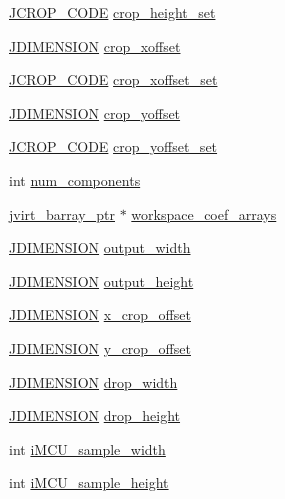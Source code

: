 \begin{DoxyCompactItemize}
\hyperlink{transupp_8h_a8286e58d1d84a5e78d711cd37e9b68a2}{J\+C\+R\+O\+P\+\_\+\+C\+O\+D\+E} \hyperlink{structjpeg__transform__info_a4033ed36c4d01a9481dbc5cef334ef1c}{crop\+\_\+height\+\_\+set}
\item 
\hyperlink{jmorecfg_8h_a04ed4674f6f1d0d50ec241531e38274f}{J\+D\+I\+M\+E\+N\+S\+I\+O\+N} \hyperlink{structjpeg__transform__info_a88127ce4987f06cc0cbf84398f277095}{crop\+\_\+xoffset}
\item 
\hyperlink{transupp_8h_a8286e58d1d84a5e78d711cd37e9b68a2}{J\+C\+R\+O\+P\+\_\+\+C\+O\+D\+E} \hyperlink{structjpeg__transform__info_a8c8de4faefef7497d94eaa29c67c93fc}{crop\+\_\+xoffset\+\_\+set}
\item 
\hyperlink{jmorecfg_8h_a04ed4674f6f1d0d50ec241531e38274f}{J\+D\+I\+M\+E\+N\+S\+I\+O\+N} \hyperlink{structjpeg__transform__info_a71c704caef9a80035e4076c41b4cb3f4}{crop\+\_\+yoffset}
\item 
\hyperlink{transupp_8h_a8286e58d1d84a5e78d711cd37e9b68a2}{J\+C\+R\+O\+P\+\_\+\+C\+O\+D\+E} \hyperlink{structjpeg__transform__info_a246724b0945d6cfd8b52cec7cd7f0d82}{crop\+\_\+yoffset\+\_\+set}
\item 
int \hyperlink{structjpeg__transform__info_a87e3cb664c289649af4ef16b528d995e}{num\+\_\+components}
\item 
\hyperlink{jpeglib_8h_a994f4cba141d82ded90af38e51223f0b}{jvirt\+\_\+barray\+\_\+ptr} $\ast$ \hyperlink{structjpeg__transform__info_a76eb9df454f32d48eafb01b3f433da5c}{workspace\+\_\+coef\+\_\+arrays}
\item 
\hyperlink{jmorecfg_8h_a04ed4674f6f1d0d50ec241531e38274f}{J\+D\+I\+M\+E\+N\+S\+I\+O\+N} \hyperlink{structjpeg__transform__info_ad7b80a24544a8287eae5d4c51b763f39}{output\+\_\+width}
\item 
\hyperlink{jmorecfg_8h_a04ed4674f6f1d0d50ec241531e38274f}{J\+D\+I\+M\+E\+N\+S\+I\+O\+N} \hyperlink{structjpeg__transform__info_a2fad8399e6b85f850152929e279eace5}{output\+\_\+height}
\item 
\hyperlink{jmorecfg_8h_a04ed4674f6f1d0d50ec241531e38274f}{J\+D\+I\+M\+E\+N\+S\+I\+O\+N} \hyperlink{structjpeg__transform__info_ad96a77528f72b2251b94d04ae396b435}{x\+\_\+crop\+\_\+offset}
\item 
\hyperlink{jmorecfg_8h_a04ed4674f6f1d0d50ec241531e38274f}{J\+D\+I\+M\+E\+N\+S\+I\+O\+N} \hyperlink{structjpeg__transform__info_adeadce805b25751fd43263e2fcd2e166}{y\+\_\+crop\+\_\+offset}
\item 
\hyperlink{jmorecfg_8h_a04ed4674f6f1d0d50ec241531e38274f}{J\+D\+I\+M\+E\+N\+S\+I\+O\+N} \hyperlink{structjpeg__transform__info_a6c63db1d6f705cc9e4bccd2efee11bde}{drop\+\_\+width}
\item 
\hyperlink{jmorecfg_8h_a04ed4674f6f1d0d50ec241531e38274f}{J\+D\+I\+M\+E\+N\+S\+I\+O\+N} \hyperlink{structjpeg__transform__info_a4e51b93c0ac407e998e8d643465c48bb}{drop\+\_\+height}
\item 
int \hyperlink{structjpeg__transform__info_a6c67f5ce5320a5d532acd6a6df14f1f4}{i\+M\+C\+U\+\_\+sample\+\_\+width}
\item 
int \hyperlink{structjpeg__transform__info_a6b6606b8e8315e161fda4ddb29b2d410}{i\+M\+C\+U\+\_\+sample\+\_\+height}
\end{DoxyCompactItemize}


